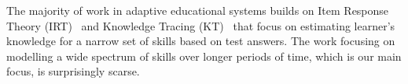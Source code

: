 \documentclass[letterpaper]{article} %
\begin{document}

The majority of work in adaptive educational systems builds on Item Response Theory (IRT)~\cite{Rasch1960,Pelanek2017} and Knowledge Tracing (KT)~\cite{yudelson2013individualized} that focus on estimating learner's knowledge for a narrow set of skills based on test answers. The work focusing on modelling a wide spectrum of skills over longer periods of time, which is our main focus, is surprisingly scarse.  
\end{document}
